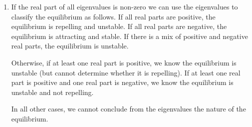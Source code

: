 \begin{enumerate}
\begin{enumerate}

		      \item If the real part of all eigenvalues is non-zero we can use the eigenvalues to classify the equilibrium
		            as follows. If all real parts are positive, the equilibrium is repelling and unstable. If all real parts are negative, the equilibrium
		            is attracting and stable. If there is a mix of positive and negative real parts, the equilibrium is unstable.

		            Otherwise, if at least one real part is positive, we know the equilibrium is unstable (but cannot determine whether it is repelling).
		            If at least one real part is positive and one real part is negative, we know the equilibrium is unstable
		            and not repelling.

		            In all other cases, we cannot conclude from the eigenvalues the nature of the equilibrium.
	      \end{enumerate}
\end{enumerate}
